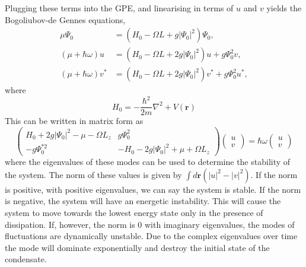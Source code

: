 Plugging these terms into the GPE, and linearising in terms of $u$ and $v$ yields the Bogoliubov-de Gennes equations,
\begin{subequations}\label{eqn:bogo_lhsrhs}
\begin{align}
    \mu \Psi_0 &= (H_0 - \Omega L + g |\Psi_0|^2)\Psi_0,\\
    (\mu +\hbar\omega)u &= (H_0 - \Omega L + 2g|\Psi_0|^2)u + g\Psi_0^2 v,\\
    (\mu +\hbar\omega)v^{*} &= (H_0 - \Omega L + 2g|\Psi_0|^2)v^{*} + g\Psi_0^2 u^{*},
\end{align}
\end{subequations}
where
\begin{equation}\label{eqn:bogo_h0}
H_0 = -\frac{\hbar^2}{2m}\nabla^2 + V(\mathbf{r})
\end{equation}
This can be written in matrix form as
\begin{equation}
    \begin{pmatrix}
        H_0 + 2g|\Psi_0|^2- \mu -\Omega L_z & g\Psi_0^2 \\
        -g\Psi_0^{*2} & -H_0 - 2g|\Psi_0|^2 + \mu +\Omega L_z
    \end{pmatrix}
    \begin{pmatrix}
        u \\
        v
    \end{pmatrix}
    = \hbar\omega
    \begin{pmatrix}
        u \\
        v
    \end{pmatrix}
\end{equation}
where the eigenvalues of these modes can be used to determine the stability of the system. The norm of these values is given by $\int d\mathbf{r}(|u|^2 - |v|^2)$. If the norm is positive, with positive eigenvalues, we can say the system is stable. If the norm is negative, the system will have an energetic instability. This will cause the system to move towards the lowest energy state only in the presence of dissipation. If, however, the norm is 0 with imaginary eigenvalues, the modes of fluctuations are dynamically unstable. Due to the complex eigenvalues over time the mode will dominate exponentially and destroy the initial state of the condensate. %

